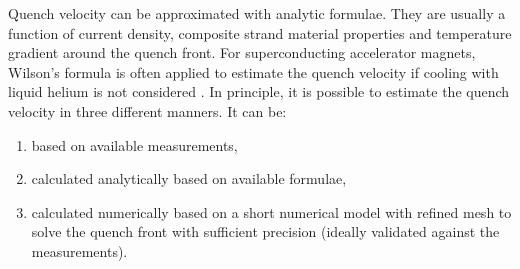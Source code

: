 Quench velocity can be approximated with analytic formulae. They are usually a function of current density, composite strand material properties and temperature gradient around the quench front. For superconducting accelerator magnets, Wilson's formula is often applied to estimate the quench velocity if cooling with liquid helium is not considered \cite[p.~206]{wilson1987superconducting}. In principle, it is possible to estimate the quench velocity in three different manners. It can be:
\begin{enumerate}
\item based on available measurements,
\item calculated analytically based on available formulae,
\item calculated numerically based on a short numerical model with refined mesh to solve the quench front with sufficient precision (ideally validated against the measurements).
\end{enumerate}